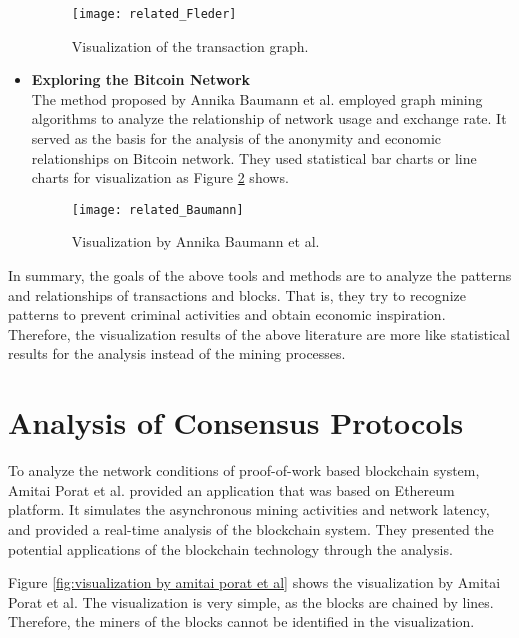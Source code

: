 \begin{itemize}
        \begin{figure}[htb]
            \centering
            \texttt{[image: related\_Fleder]}
            \caption{Visualization of the transaction graph.}
            \label{fig:visualization of the transaction graph}
        \end{figure}
    \item \textbf{Exploring the Bitcoin Network} \cite{Baumann2014} \\
        The method proposed by Annika Baumann et al. employed graph mining algorithms to analyze the relationship of network usage and exchange rate. It served as the basis for the analysis of the anonymity and economic relationships on Bitcoin network. They used statistical bar charts or line charts for visualization as Figure \ref{fig:visualization by annika baumann et al} \cite{Baumann2014} shows.
        \begin{figure}[htb]
            \centering
            \texttt{[image: related\_Baumann]}
            \caption{Visualization by Annika Baumann et al.}
            \label{fig:visualization by annika baumann et al}
        \end{figure}
\end{itemize}

In summary, the goals of the above tools and methods are to analyze the patterns and relationships of transactions and blocks. That is, they try to recognize patterns to prevent criminal activities and obtain economic inspiration. Therefore, the visualization results of the above literature are more like statistical results for the analysis instead of the mining processes.

\section{Analysis of Consensus Protocols}

To analyze the network conditions of proof-of-work based blockchain system, Amitai Porat et al. \cite{Porat} provided an application that was based on Ethereum platform. It simulates the asynchronous mining activities and network latency, and provided a real-time analysis of the blockchain system. They presented the potential applications of the blockchain technology through the analysis.

Figure \ref{fig:visualization by amitai porat et al} \cite{Porat} shows the visualization by Amitai Porat et al. The visualization is very simple, as the blocks are chained by lines. Therefore, the miners of the blocks cannot be identified in the visualization.

